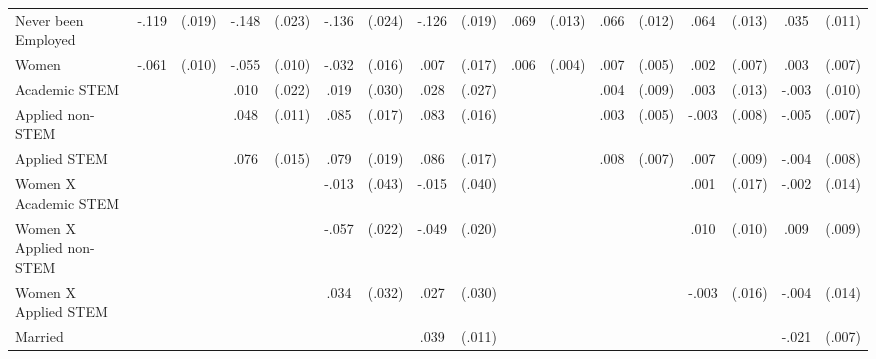 \begin{table}[htbp]
\begin{tabular}{l*{8}{cc}}
Never been Employed&    -.119\sym{***}&   (.019)&    -.148\sym{***}&   (.023)&    -.136\sym{***}&   (.024)&    -.126\sym{***}&   (.019)&     .069\sym{***}&   (.013)&     .066\sym{***}&   (.012)&     .064\sym{***}&   (.013)&     .035\sym{**} &   (.011)\\
Women           &    -.061\sym{***}&   (.010)&    -.055\sym{***}&   (.010)&    -.032\sym{*}  &   (.016)&     .007         &   (.017)&     .006         &   (.004)&     .007         &   (.005)&     .002         &   (.007)&     .003         &   (.007)\\
Academic STEM   &                  &         &     .010         &   (.022)&     .019         &   (.030)&     .028         &   (.027)&                  &         &     .004         &   (.009)&     .003         &   (.013)&    -.003         &   (.010)\\
Applied non-STEM&                  &         &     .048\sym{***}&   (.011)&     .085\sym{***}&   (.017)&     .083\sym{***}&   (.016)&                  &         &     .003         &   (.005)&    -.003         &   (.008)&    -.005         &   (.007)\\
Applied STEM    &                  &         &     .076\sym{***}&   (.015)&     .079\sym{***}&   (.019)&     .086\sym{***}&   (.017)&                  &         &     .008         &   (.007)&     .007         &   (.009)&    -.004         &   (.008)\\
Women X Academic STEM&                  &         &                  &         &    -.013         &   (.043)&    -.015         &   (.040)&                  &         &                  &         &     .001         &   (.017)&    -.002         &   (.014)\\
Women X Applied non-STEM&                  &         &                  &         &    -.057\sym{**} &   (.022)&    -.049\sym{*}  &   (.020)&                  &         &                  &         &     .010         &   (.010)&     .009         &   (.009)\\
Women X Applied STEM&                  &         &                  &         &     .034         &   (.032)&     .027         &   (.030)&                  &         &                  &         &    -.003         &   (.016)&    -.004         &   (.014)\\
Married         &                  &         &                  &         &                  &         &     .039\sym{***}&   (.011)&                  &         &                  &         &                  &         &    -.021\sym{**} &   (.007)\\

\end{tabular}
\end{table}
